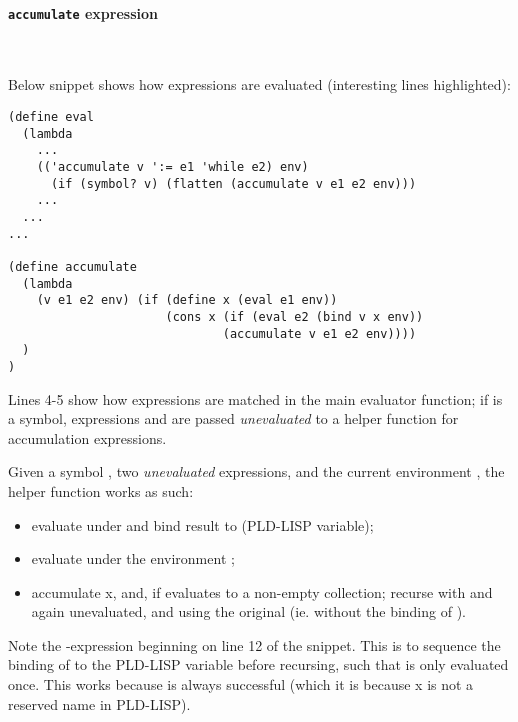 \paragraph{\texttt{accumulate} expression}~\smallskip

Below snippet shows how  expressions are evaluated (interesting
lines highlighted):

\begin{verbatim}
(define eval
  (lambda
    ...
    (('accumulate v ':= e1 'while e2) env) 
      (if (symbol? v) (flatten (accumulate v e1 e2 env)))
    ...
  ...
...

(define accumulate
  (lambda
    (v e1 e2 env) (if (define x (eval e1 env))
                      (cons x (if (eval e2 (bind v x env))
                              (accumulate v e1 e2 env))))
  )
)
\end{verbatim}

Lines 4-5 show how  expressions are matched in the main evaluator
function; if  is a symbol, expressions  and  are passed
\emph{unevaluated} to a helper function for accumulation expressions.

\medskip

Given a symbol , two \emph{unevaluated} expressions, and the current
environment , the  helper function works as such:

\begin{itemize}
  \item evaluate  under  and bind result to  (PLD-LISP
    variable);
  \item evaluate  under the environment ;
  \item accumulate \ms x, and, if  evaluates to a non-empty collection;
    recurse with  and  again unevaluated, and using the original
     (ie. without the binding of ).
\end{itemize}

Note the -expression beginning on line 12 of the snippet. This is to
sequence the binding of  to the PLD-LISP variable  before
recursing, such that  is only evaluated once. This works because
 is always successful (which it is because \ms x is not a reserved
name in PLD-LISP).

\sectend

